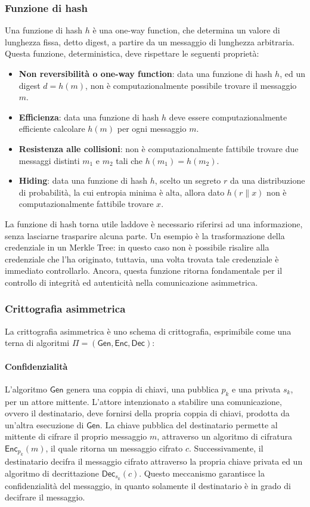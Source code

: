 \documentclass[a4paper,12pt]{article}
\begin{document}
\subsubsection{Funzione di hash}
Una funzione di hash $h$ è una one-way function, che determina un valore di lunghezza fissa, detto digest, a partire da un messaggio di lunghezza arbitraria. Questa funzione, deterministica, deve rispettare le seguenti proprietà:
\begin{itemize}
    \item \textbf{Non reversibilità o one-way function}: data una funzione di hash $h$, ed un digest $d=h(m)$, non è computazionalmente possibile trovare il messaggio $m$.
    \item \textbf{Efficienza}: data una funzione di hash $h$ deve essere computazionalmente efficiente calcolare $h(m)$ per ogni messaggio $m$.
    \item \textbf{Resistenza alle collisioni}: non è computazionalmente fattibile trovare due messaggi distinti $m_1$ e $m_2$ tali che $h(m_1)=h(m_2)$.
    \item \textbf{Hiding}: data una funzione di hash $h$, scelto un segreto $r$ da una distribuzione di probabilità, la cui entropia minima è alta, allora dato $h(r\|x)$ non è computazionalmente fattibile trovare $x$.
\end{itemize}
La funzione di hash torna utile laddove è necessario riferirsi ad una informazione, senza lasciarne trasparire alcuna parte. Un esempio è la trasformazione della credenziale in un Merkle Tree: in questo caso non è possibile risalire alla credenziale che l'ha originato, tuttavia, una volta trovata tale credenziale è immediato controllarlo.
\newline Ancora, questa funzione ritorna fondamentale per il controllo di integrità ed autenticità nella comunicazione asimmetrica.

\subsubsection{Crittografia asimmetrica}
La crittografia asimmetrica è uno schema di crittografia, esprimibile come una terna di algoritmi $\Pi=\mathsf{(Gen, Enc, Dec)}$:
\paragraph{Confidenzialità} 
L'algoritmo $\mathsf{Gen}$ genera una coppia di chiavi, una pubblica $p_k$ e una privata $s_k$, per un attore mittente. L'attore intenzionato a stabilire una comunicazione, ovvero il destinatario, deve fornirsi della propria coppia di chiavi, prodotta da un'altra esecuzione di $\mathsf{Gen}$. 
La chiave pubblica del destinatario permette al mittente di cifrare il proprio messaggio $m$, attraverso un algoritmo di cifratura $\mathsf{Enc}_{p_k}(m)$, il quale ritorna un messaggio cifrato $c$. Successivamente, il destinatario decifra il messaggio cifrato attraverso la propria chiave privata ed un algoritmo di decrittazione $\mathsf{Dec}_{s_k}(c)$.
Questo meccanismo garantisce la confidenzialità del messaggio, in quanto solamente il destinatario è in grado di decifrare il messaggio.
\end{document}
